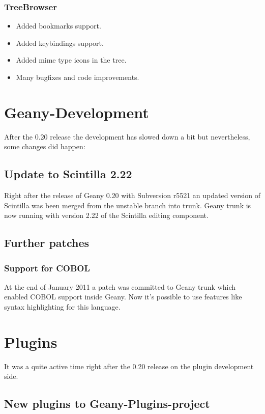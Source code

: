 \documentclass[%
paper=a4,%
fontsize=12pt,%
twoside=false,%
DIV18,
headsepline,
plainheadsepline,
footsepline,
plainfootsepline,
parskip=half,%
openany,%
]{scrartcl}
\begin{document}
\subsubsection{TreeBrowser}
\begin{itemize}
	\item Added bookmarks support.
	\item Added keybindings support.
	\item Added mime type icons in the tree.
	\item Many bugfixes and code improvements.
\end{itemize}

\newpage

\section{Geany-Development}

After the 0.20 release the development has slowed down a bit but
nevertheless, some changes did happen:

\subsection{Update to Scintilla 2.22}

Right after the release of Geany 0.20 with Subversion r5521 an
updated version of Scintilla was been merged from the unstable branch
into trunk. Geany trunk is now running with version 2.22 of
the Scintilla editing component.

\subsection{Further patches}
\subsubsection{Support for COBOL}

At the end of January 2011 a patch was committed to Geany trunk which
enabled COBOL support inside Geany. Now it's possible to use
features like syntax highlighting for this language.


\section{Plugins}

It was a quite active time right after the 0.20 release on the plugin
development side.

\subsection{New plugins to Geany-Plugins-project}
\end{document}
